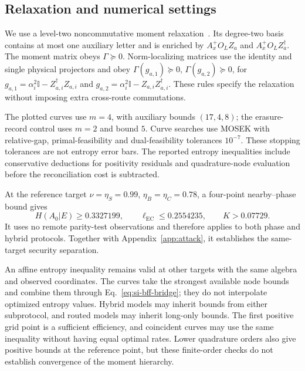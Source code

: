 \documentclass[aps,10pt,onecolumn,prx,superscriptaddress,longbibliography,nofootinbib]{revtex4-2}
\newcommand{\id}{\mathbb I}
\newcommand{\EC}{\ell_{\mathrm{EC}}}
\begin{document}
\subsection{Relaxation and numerical settings}

We use a level-two noncommutative moment relaxation~\cite{NPA2007,NPA2008,Pironio2010}. Its degree-two basis contains at most one auxiliary letter and is enriched by \(A_x^+O_LZ_a\) and \(A_x^+O_LZ_a^\dagger\). The moment matrix obeys \(\Gamma\succeq0\). Norm-localizing matrices use the identity and single physical projectors and obey \(\Gamma(g_{a,1})\succeq0\), \(\Gamma(g_{a,2})\succeq0\), for \(g_{a,1}=\alpha_i^2\id-Z_{a,i}^\dagger Z_{a,i}\) and \(g_{a,2}=\alpha_i^2\id-Z_{a,i}Z_{a,i}^\dagger\). These rules specify the relaxation without imposing extra cross-route commutations.

The plotted curves use \(m=4\), with auxiliary bounds \((17,4,8)\); the erasure-record control uses \(m=2\) and bound \(5\). Curve searches use MOSEK with relative-gap, primal-feasibility and dual-feasibility tolerances \(10^{-7}\). These stopping tolerances are not entropy error bars. The reported entropy inequalities include conservative deductions for positivity residuals and quadrature-node evaluation before the reconciliation cost is subtracted.

At the reference target \(\nu=\eta_S=0.99\), \(\eta_B=\eta_C=0.78\), a four-point nearby--phase bound gives
\begin{equation}
 H(A_0|E)\geq0.3327199,\qquad
 \EC\leq0.2554235,\qquad
 K>0.07729.
 \label{eq:si-reference-rate}
\end{equation}
It uses no remote parity-test observations and therefore applies to both phase and hybrid protocols. Together with Appendix~\ref{app:attack}, it establishes the same-target security separation.

An affine entropy inequality remains valid at other targets with the same algebra and observed coordinates. The curves take the strongest available node bounds and combine them through Eq.~\eqref{eq:si-bff-bridge}; they do not interpolate optimized entropy values. Hybrid models may inherit bounds from either subprotocol, and routed models may inherit long-only bounds. The first positive grid point is a sufficient efficiency, and coincident curves may use the same inequality without having equal optimal rates. Lower quadrature orders also give positive bounds at the reference point, but these finite-order checks do not establish convergence of the moment hierarchy.
\end{document}
